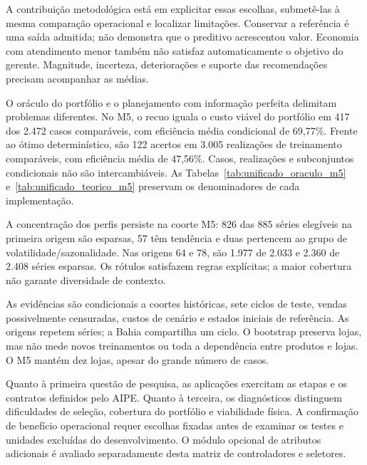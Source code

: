 A contribuição metodológica está em explicitar essas escolhas, submetê-las à mesma comparação operacional e localizar limitações. Conservar a referência é uma saída admitida; não demonstra que o preditivo acrescentou valor. Economia com atendimento menor também não satisfaz automaticamente o objetivo do gerente. Magnitude, incerteza, deteriorações e suporte das recomendações precisam acompanhar as médias.

O oráculo do portfólio e o planejamento com informação perfeita delimitam problemas diferentes. No M5, o recuo iguala o custo viável do portfólio em 417 dos 2.472 casos comparáveis, com eficiência média condicional de 69,77\%. Frente ao ótimo determinístico, são 122 acertos em 3.005 realizações de treinamento comparáveis, com eficiência média de 47,56\%. Casos, realizações e subconjuntos condicionais não são intercambiáveis. As Tabelas~\ref{tab:unificado_oraculo_m5} e~\ref{tab:unificado_teorico_m5} preservam os denominadores de cada implementação.

A concentração dos perfis persiste na coorte M5: 826 das 885 séries elegíveis na primeira origem são esparsas, 57 têm tendência e duas pertencem ao grupo de volatilidade/sazonalidade. Nas origens 64 e 78, são 1.977 de 2.033 e 2.360 de 2.408 séries esparsas. Os rótulos satisfazem regras explícitas; a maior cobertura não garante diversidade de contexto.

As evidências são condicionais a coortes históricas, sete ciclos de teste, vendas possivelmente censuradas, custos de cenário e estados iniciais de referência. As origens repetem séries; a Bahia compartilha um ciclo. O bootstrap preserva lojas, mas não mede novos treinamentos ou toda a dependência entre produtos e lojas. O M5 mantém dez lojas, apesar do grande número de casos.

Quanto à primeira questão de pesquisa, as aplicações exercitam as etapas e os contratos definidos pelo AIPE. Quanto à terceira, os diagnósticos distinguem dificuldades de seleção, cobertura do portfólio e viabilidade física. A confirmação de benefício operacional requer escolhas fixadas antes de examinar os testes e unidades excluídas do desenvolvimento. O módulo opcional de atributos adicionais é avaliado separadamente desta matriz de controladores e seletores.
